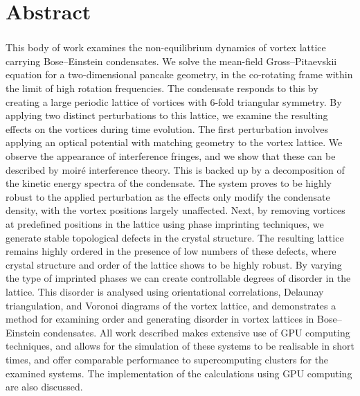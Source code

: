 \chapter*{Abstract}
\subsection*{\thesistitle}

This body of work examines the non-equilibrium dynamics of vortex lattice carrying Bose--Einstein condensates. We solve the mean-field Gross--Pitaevskii equation for a two-dimensional pancake geometry, in the co-rotating frame within the limit of high rotation frequencies. The condensate responds to this by creating a large periodic lattice of vortices with 6-fold triangular symmetry. By applying two distinct perturbations to this lattice, we examine the resulting effects on the vortices during time evolution. The first perturbation involves applying an optical potential with matching geometry to the vortex lattice. We observe the appearance of interference fringes, and we show that these can be described by moir\'e interference theory. This is backed up by a decomposition of the kinetic energy spectra of the condensate. The system proves to be highly robust to the applied perturbation as the effects only modify the condensate density, with the vortex positions largely unaffected. Next, by removing vortices at predefined positions in the lattice using phase imprinting techniques, we generate stable topological defects in the crystal structure.  The resulting lattice remains highly ordered in the presence of low numbers of these defects, where crystal structure and order of the lattice shows to be highly robust. By varying the type of imprinted phases we can create controllable degrees of disorder in the lattice. This disorder is analysed using orientational correlations, Delaunay triangulation, and Voronoi diagrams of the vortex lattice, and demonstrates a method for examining order and generating disorder in vortex lattices in Bose--Einstein condensates. All work described makes extensive use of GPU computing techniques, and allows for the simulation of these systems to be realisable in short times, and offer comparable performance to supercomputing clusters for the examined systems. The implementation of the calculations using GPU computing are also discussed.

